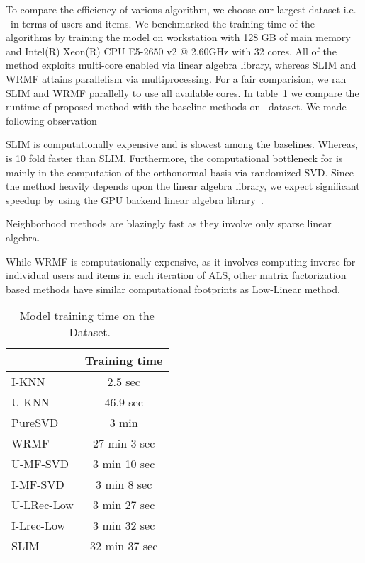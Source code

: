
To compare the efficiency of various algorithm, we choose our largest dataset i.e. \Lowes\ in terms of users and items. 
We benchmarked the training time of the algorithms 
by training the model on  workstation with 128 GB of main memory and Intel(R) Xeon(R) CPU E5-2650 v2 @ 2.60GHz with 32 cores. All of the method exploits multi-core enabled via linear algebra library, whereas SLIM and WRMF attains parallelism via multiprocessing. For a fair comparision, we ran  SLIM and WRMF parallelly to use all available cores.  In table~\ref{tbl:runtime_lowes} we compare the runtime of proposed method with the baseline methods on \Lowes\ dataset. We  made following observation
\begin{compactitem}
\item  SLIM is computationally expensive and is slowest among the baselines. Whereas, \LinearLow is 10 fold faster than SLIM. Furthermore, the computational bottleneck for \LinearLow is mainly in the computation of the orthonormal basis via 
randomized SVD. Since the method heavily depends upon the linear algebra library, we expect significant speedup by using the GPU backend linear algebra library~\citep{Voronin:GPURSVD}. 
\item Neighborhood methods are blazingly fast as they involve only sparse linear algebra.
\item While WRMF is computationally expensive, as it involves computing inverse for individual users and items in each iteration of ALS, other matrix factorization based methods have similar computational footprints as Low-Linear method.
\end{compactitem}

\begin{table}[!htb]
\centering
\caption{Model training time on the  \Guitar\ Dataset.}
\label{tbl:runtime_lowes}
\begin{tabular}{l|c}
\hline
 & Training time \\
\hline
I-KNN & 2.5 sec \\ 
U-KNN & 46.9 sec \\
PureSVD & 3 min \\
WRMF & 27 min 3 sec \\
U-MF-SVD &  3 min 10 sec \\
I-MF-SVD & 3 min 8 sec \\ 
U-LRec-Low & 3 min 27 sec \\
I-Lrec-Low & 3 min 32 sec \\
SLIM  & 32 min 37 sec  \\
\hline
\end{tabular}
\end{table}